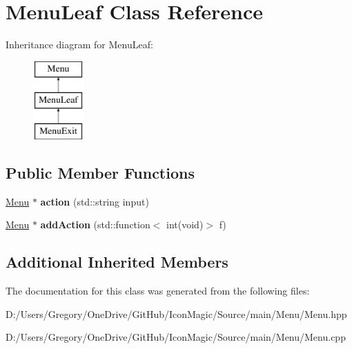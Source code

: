 \hypertarget{class_menu_leaf}{}\section{Menu\+Leaf Class Reference}
\label{class_menu_leaf}
Inheritance diagram for Menu\+Leaf\+:\begin{figure}[H]
\begin{center}
\leavevmode
\includegraphics[height=3.000000cm]{class_menu_leaf}
\end{center}
\end{figure}
\subsection*{Public Member Functions}
\begin{DoxyCompactItemize}
\item 
\hypertarget{class_menu_leaf_a56748320ba902329a5c5dbe736f3a635}{}\hyperlink{class_menu}{Menu} $\ast$ {\bfseries action} (std\+::string input)\label{class_menu_leaf_a56748320ba902329a5c5dbe736f3a635}

\item 
\hypertarget{class_menu_leaf_a305d6b886a7c763d9e31b8196607d9a5}{}\hyperlink{class_menu}{Menu} $\ast$ {\bfseries add\+Action} (std\+::function$<$ int(void)$>$ f)\label{class_menu_leaf_a305d6b886a7c763d9e31b8196607d9a5}

\end{DoxyCompactItemize}
\subsection*{Additional Inherited Members}


The documentation for this class was generated from the following files\+:\begin{DoxyCompactItemize}
\item 
D\+:/\+Users/\+Gregory/\+One\+Drive/\+Git\+Hub/\+Icon\+Magic/\+Source/main/\+Menu/Menu.\+hpp\item 
D\+:/\+Users/\+Gregory/\+One\+Drive/\+Git\+Hub/\+Icon\+Magic/\+Source/main/\+Menu/Menu.\+cpp\end{DoxyCompactItemize}
